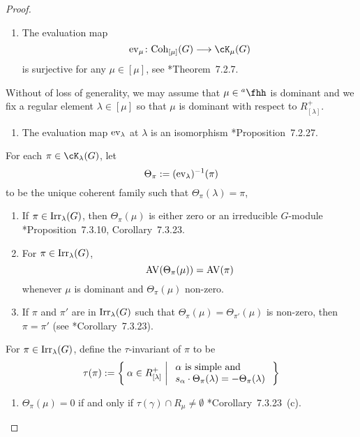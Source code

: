 \documentclass[counting_main.tex]{subfiles}
\begin{document}
\begin{proof}
  \begin{enumerate}[label=(\alph*)]
    \item \label{it:t1} The evaluation map
          \[
          \ev{\mu}\colon \Coh_{[\mu]}(G)\longrightarrow \Grt_{\mu}(G)
          \]
          is surjective for any $\mu \in [\mu]$, see \cite{Vg}*{Theorem~7.2.7}.
  \end{enumerate}
  Without of loss of generality, we may assume that $\mu\in \ahh$ is dominant
  and we fix a regular element $\lambda \in [\mu]$ so that $\mu$ is dominant
  with respect to $R^{+}_{[\lambda]}$.
  \begin{enumerate}[resume*]
    \item \label{it:t2} The evaluation map ${\mathrm{ev}_{\lambda}}$ at $\lambda$ is an
          isomorphism \cite{Vg}*{Proposition~7.2.27}.
  \end{enumerate}
  For each $\pi\in \Grt_{\lambda}(G)$, let
  \[
    \Theta_{\pi}:= ({\mathrm{ev}_{\lambda}})^{-1}(\pi)
  \]
  to be the unique coherent family such that $\Theta_{\pi}(\lambda) = \pi$,
  \begin{enumerate}[resume*]
    \item \label{it:t3} If $\pi\in \mathrm{Irr}_{\lambda}(G)$, then $\Theta_{\pi}(\mu)$
          is either zero or an irreducible $G$-module
          \cite{Vg}*{Proposition~7.3.10, Corollary~7.3.23}.
    \item \label{it:t4} For $\pi\in \mathrm{Irr}_{\lambda}(G)$,
          \[
          \mathrm{AV}(\Theta_{\pi}(\mu)) = \mathrm{AV}(\pi)
          \]
          whenever $\mu$ is dominant and $\Theta_{\pi}(\mu)$ non-zero.
    \item \label{it:t5} If $\pi$ and $\pi'$ are in $\mathrm{Irr}_{\lambda}(G)$ such that
          $\Theta_{\pi}(\mu) = \Theta_{\pi'}(\mu)$ is non-zero, then $\pi=\pi'$
          (see \cite{V4}*{Corollary~7.3.23}).
  \end{enumerate}
  For $\pi\in \mathrm{Irr}_{\lambda}(G)$, define the $\tau$-invariant of $\pi$ to be
  \begin{equation}\label{eq:taupi}
    \tau(\pi) := \Set{\alpha\in R^{+}_{[\lambda]}|
      \begin{array}{l}
        \text{$\alpha$ is simple and }\\
        s_{\alpha}\cdot \Theta_{\pi}(\lambda) = -\Theta_{\pi}(\lambda)
      \end{array}
    }
  \end{equation}
  \begin{enumerate}[resume*]
    \item
          \label{it:t6}
          $\Theta_{\pi}(\mu) =0$ if and only if
          $\tau(\gamma)\cap R_\mu \neq \emptyset$
          \cite{Vg}*{Corollary~7.3.23~(c)}.
  \end{enumerate}


\end{proof}
\end{document}
